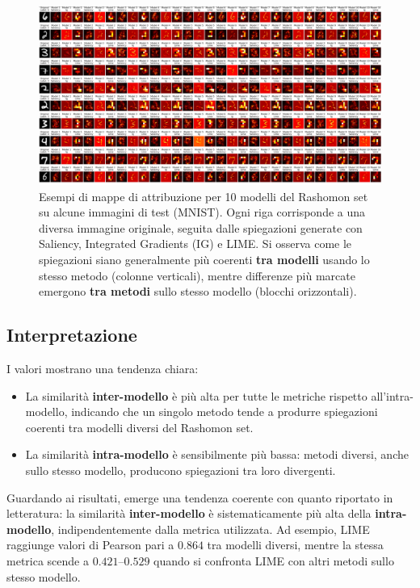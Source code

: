 \documentclass{article}
\begin{document}
\begin{figure}[h!]
      \centering
      \includegraphics[width=\textwidth]{images/visualizzazione (2).png}
      \caption{Esempi di mappe di attribuzione per 10 modelli del Rashomon set su alcune immagini di test (MNIST).
            Ogni riga corrisponde a una diversa immagine originale, seguita dalle spiegazioni generate con Saliency, Integrated Gradients (IG) e LIME.
            Si osserva come le spiegazioni siano generalmente più coerenti \textbf{tra modelli} usando lo stesso metodo (colonne verticali),
            mentre differenze più marcate emergono \textbf{tra metodi} sullo stesso modello (blocchi orizzontali).}
      \label{fig:similarity_examples}
\end{figure}

\subsection{Interpretazione}
I valori mostrano una tendenza chiara:
\begin{itemize}
      \item La similarità \textbf{inter-modello} è più alta per tutte le metriche rispetto
            all'intra-modello, indicando che un singolo metodo tende a produrre spiegazioni
            coerenti tra modelli diversi del Rashomon set.
      \item La similarità \textbf{intra-modello} è sensibilmente più bassa: metodi diversi,
            anche sullo stesso modello, producono spiegazioni tra loro divergenti.
\end{itemize}

Guardando ai risultati, emerge una tendenza coerente con quanto riportato in
letteratura: la similarità \textbf{inter-modello} è sistematicamente più alta
della \textbf{intra-modello}, indipendentemente dalla metrica utilizzata. Ad
esempio, LIME raggiunge valori di Pearson pari a $0.864$ tra modelli diversi,
mentre la stessa metrica scende a $0.421$–$0.529$ quando si confronta LIME con
altri metodi sullo stesso modello.
\end{document}
